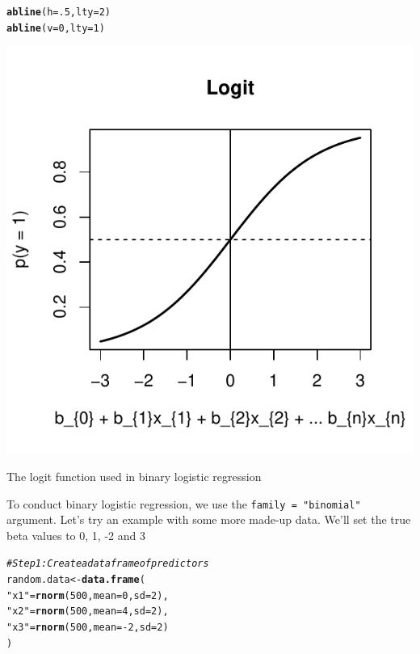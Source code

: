 \documentclass{tufte-book}\usepackage[]{graphicx}\usepackage[]{color}
\makeatletter
\def\maxwidth{ %
  \ifdim\Gin@nat@width>\linewidth
    \linewidth
  \else
    \Gin@nat@width
  \fi
}
\newcommand{\hlnum}[1]{\textcolor[rgb]{0.686,0.059,0.569}{#1}}%
\newcommand{\hlstr}[1]{\textcolor[rgb]{0.192,0.494,0.8}{#1}}%
\newcommand{\hlcom}[1]{\textcolor[rgb]{0.678,0.584,0.686}{\textit{#1}}}%
\newcommand{\hlopt}[1]{\textcolor[rgb]{0,0,0}{#1}}%
\newcommand{\hlstd}[1]{\textcolor[rgb]{0.345,0.345,0.345}{#1}}%
\newcommand{\hlkwb}[1]{\textcolor[rgb]{0.69,0.353,0.396}{#1}}%
\newcommand{\hlkwc}[1]{\textcolor[rgb]{0.333,0.667,0.333}{#1}}%
\newcommand{\hlkwd}[1]{\textcolor[rgb]{0.737,0.353,0.396}{\textbf{#1}}}%
\newenvironment{kframe}{%
 \def\at@end@of@kframe{}%
 \ifinner\ifhmode%
  \def\at@end@of@kframe{\end{minipage}}%
  \begin{minipage}{\columnwidth}%
 \fi\fi%
 \def\FrameCommand##1{\hskip\@totalleftmargin \hskip-\fboxsep
 \colorbox{shadecolor}{##1}\hskip-\fboxsep
     \hskip-\linewidth \hskip-\@totalleftmargin \hskip\columnwidth}%
 \MakeFramed {\advance\hsize-\width
   \@totalleftmargin\z@ \linewidth\hsize
   \@setminipage}}%
 {\par\unskip\endMakeFramed%
 \at@end@of@kframe}
\newenvironment{knitrout}{}{} %
\makeatother
\begin{document}
\begin{footnotesize}
\begin{marginfigure}
\begin{tiny}
\begin{knitrout}
\begin{kframe}
\begin{alltt}
\hlkwd{abline}\hlstd{(}\hlkwc{h} \hlstd{=} \hlnum{.5}\hlstd{,} \hlkwc{lty} \hlstd{=} \hlnum{2}\hlstd{)}
\hlkwd{abline}\hlstd{(}\hlkwc{v} \hlstd{=} \hlnum{0}\hlstd{,} \hlkwc{lty} \hlstd{=} \hlnum{1}\hlstd{)}
\end{alltt}
\end{kframe}
\includegraphics[width=\maxwidth]{figure/unnamed-chunk-237-1} 

\end{knitrout}
\caption{The logit function used in binary logistic regression}
\label{fig:logit}
\end{tiny}
\end{marginfigure}


To conduct binary logistic regression, we use the \texttt{family = "binomial"} argument. Let's try an example with some more made-up data. We'll set the true beta values to 0, 1, -2 and 3

\begin{footnotesize}
\begin{knitrout}
\color{fgcolor}\begin{kframe}
\begin{alltt}
\hlcom{# Step 1: Create a dataframe of predictors}
\hlstd{random.data} \hlkwb{<-} \hlkwd{data.frame}\hlstd{(}
             \hlstr{"x1"} \hlstd{=} \hlkwd{rnorm}\hlstd{(}\hlnum{500}\hlstd{,} \hlkwc{mean} \hlstd{=} \hlnum{0}\hlstd{,} \hlkwc{sd} \hlstd{=} \hlnum{2}\hlstd{),}
             \hlstr{"x2"} \hlstd{=} \hlkwd{rnorm}\hlstd{(}\hlnum{500}\hlstd{,} \hlkwc{mean} \hlstd{=} \hlnum{4}\hlstd{,} \hlkwc{sd} \hlstd{=} \hlnum{2}\hlstd{),}
             \hlstr{"x3"} \hlstd{=} \hlkwd{rnorm}\hlstd{(}\hlnum{500}\hlstd{,} \hlkwc{mean} \hlstd{=} \hlopt{-}\hlnum{2}\hlstd{,} \hlkwc{sd} \hlstd{=} \hlnum{2}\hlstd{)}
             \hlstd{)}


\end{alltt}
\end{kframe}
\end{knitrout}
\end{footnotesize}
\end{footnotesize}
\end{document}
